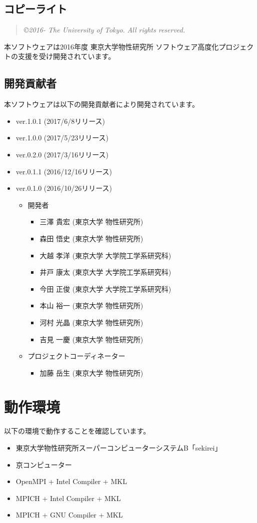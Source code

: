 \subsection{コピーライト}
\begin{quote}
{\it \copyright  2016- The University of Tokyo.} {\it All rights reserved.}
\end{quote}
本ソフトウェアは2016年度 東京大学物性研究所 ソフトウェア高度化プロジェクトの支援を受け開発されています。

\subsection{開発貢献者}
\label{subsec:developers}
本ソフトウェアは以下の開発貢献者により開発されています。
\begin{itemize}
\item{ver.1.0.1 (2017/6/8リリース)}
\item{ver.1.0.0 (2017/5/23リリース)}
\item{ver.0.2.0 (2017/3/16リリース)}
\item{ver.0.1.1 (2016/12/16リリース)}
\item{ver.0.1.0 (2016/10/26リリース)}
\begin{itemize}
\item{開発者}
	\begin{itemize}
	\item{三澤 貴宏 (東京大学 物性研究所)}
	\item{森田 悟史 (東京大学 物性研究所)}
	\item{大越 孝洋 (東京大学 大学院工学系研究科)}
	\item{井戸 康太 (東京大学 大学院工学系研究科)}
	\item{今田 正俊 (東京大学 大学院工学系研究科)}
	\item{本山 裕一 (東京大学 物性研究所)}
	\item{河村 光晶 (東京大学 物性研究所)}
	\item{吉見 一慶 (東京大学 物性研究所)}
	\end{itemize}

\item{プロジェクトコーディネーター}
	\begin{itemize}
	\item{加藤 岳生 (東京大学 物性研究所)}
	\end{itemize}

\end{itemize}

\end{itemize}


\section{動作環境}
 以下の環境で動作することを確認しています。
\begin{itemize}
\item 東京大学物性研究所スーパーコンピューターシステムB「sekirei」
\item 京コンピューター
\item OpenMPI + Intel Compiler + MKL
\item MPICH + Intel Compiler + MKL
\item MPICH + GNU Compiler + MKL
\end{itemize}
